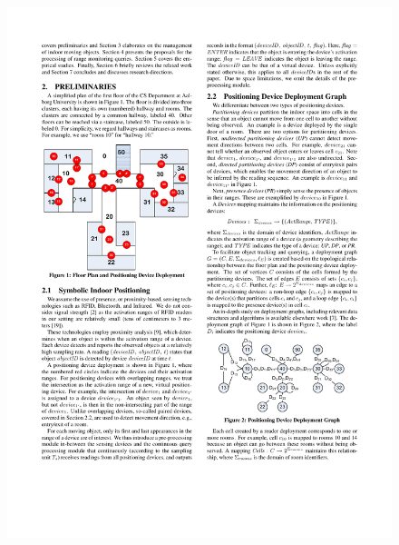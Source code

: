 \begin{frame}
\begin{columns}[c]
\begin{figure}[tb]
      \includegraphics[width=\columnwidth]{figures/2-2-2.pdf}
    \end{figure}

\end{columns}

\end{frame}
